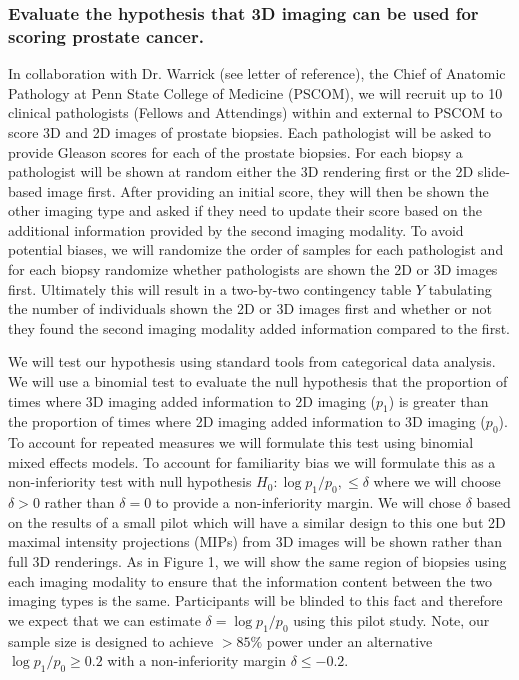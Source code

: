 \documentclass{NIHGrant}
\theoremstyle{theorem}
\begin{document}
\subsubsection*{Evaluate the hypothesis that 3D imaging can be used for scoring prostate cancer.}
In collaboration with Dr. Warrick (see letter of reference), the Chief of Anatomic Pathology at Penn State College of Medicine (PSCOM), we will recruit up to 10 clinical pathologists (Fellows and Attendings) within and external to PSCOM to score 3D and 2D images of prostate biopsies. Each pathologist will be asked to provide Gleason scores for each of the prostate biopsies. For each biopsy a pathologist will be shown at random either the 3D rendering first or the 2D slide-based image first. After providing an initial score, they will then be shown the other imaging type and asked if they need to update their score based on the additional information provided by the second imaging modality. To avoid potential biases, we will randomize the order of samples for each pathologist and for each biopsy randomize whether pathologists are shown the 2D or 3D images first. Ultimately this will result in a two-by-two contingency table \(Y\) tabulating the number of individuals shown the 2D or 3D images first and whether or not they found the second imaging modality added information compared to the first.

We will test our hypothesis using standard tools from categorical data analysis. We will use a binomial test to evaluate the null hypothesis that the proportion of times where 3D imaging added information to 2D imaging (\(p_{1}\)) is greater than the proportion of times where 2D imaging added information to 3D imaging (\(p_{0}\)). To account for repeated measures we will formulate this test using binomial mixed effects models. To account for familiarity bias we will formulate this as a non-inferiority test with null hypothesis \(H_{0}:\log p_{1}/p_{0},\leq \delta\) where we will choose  \(\delta>0\) rather than \(\delta=0\) to provide a non-inferiority margin. We will chose \(\delta\) based on the results of a small pilot which will have a similar design to this one but 2D maximal intensity projections (MIPs) from 3D images will be shown rather than full 3D renderings. As in Figure 1, we will show the same region of biopsies using each imaging modality to ensure that the information content between the two imaging types is the same. Participants will be blinded to this fact and therefore we expect that we can estimate \(\delta=\log p_{1}/p_{0}\) using this pilot study. Note, our sample size is designed to achieve \(>85\%\) power under an alternative \(\log p_{1}/p_{0}\geq 0.2\) with a non-inferiority margin \(\delta\leq-0.2\).
\end{document}
